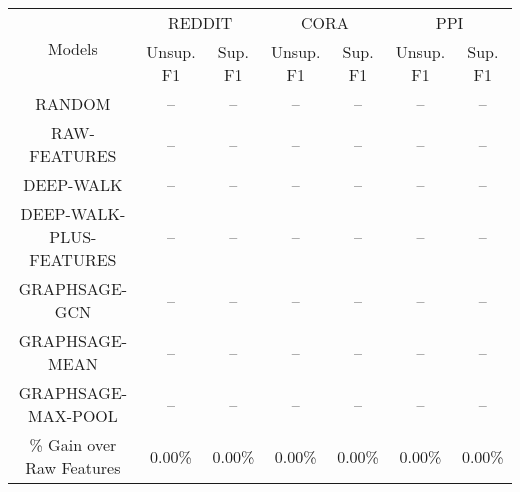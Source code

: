 \begin{tabular}{ccccccc}
    \hline
    \multirow{2}{*}{ Models } &
    	\multicolumn{2}{c}{ REDDIT } & 	\multicolumn{2}{c}{ CORA } & 	\multicolumn{2}{c}{ PPI } \\

    
    \cline { 2 - 7 } &
         Unsup. F1 & Sup. F1 &  Unsup. F1 & Sup. F1 &  Unsup. F1 & Sup. F1  \\
    
    \hline
    	RANDOM & -- & -- & -- & -- & -- & -- \\
	RAW-FEATURES & -- & -- & -- & -- & -- & -- \\
	DEEP-WALK & -- & -- & -- & -- & -- & -- \\
	DEEP-WALK-PLUS-FEATURES & -- & -- & -- & -- & -- & -- \\
	GRAPHSAGE-GCN & -- & -- & -- & -- & -- & -- \\
	GRAPHSAGE-MEAN & -- & -- & -- & -- & -- & -- \\
	GRAPHSAGE-MAX-POOL & -- & -- & -- & -- & -- & -- \\

    
    \hline
    \% Gain over Raw Features & 0.00\% & 0.00\% & 0.00\% & 0.00\% & 0.00\% & 0.00\% \\
    \hline
    \end{tabular}
